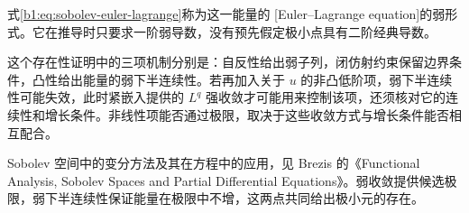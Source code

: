 式\eqref{b1:eq:sobolev-euler-lagrange}称为这一能量的%
[Euler–Lagrange equation]的弱形式。它在推导时只要求一阶弱导数，没有预先假定极小点具有二阶经典导数。

\ProseParagraphBreak

这个存在性证明中的三项机制分别是：自反性给出弱子列，闭仿射约束保留边界条件，凸性给出能量的弱下半连续性。若再加入关于 \(u\) 的非凸低阶项，弱下半连续性可能失效，此时紧嵌入提供的 \(L^q\) 强收敛才可能用来控制该项，还须核对它的连续性和增长条件。非线性项能否通过极限，取决于这些收敛方式与增长条件能否相互配合。

\ProseParagraphBreak

Sobolev 空间中的变分方法及其在方程中的应用，见 Brezis 的《Functional Analysis, Sobolev Spaces and Partial Differential Equations》\cite{Brezis2011Functional}。弱收敛提供候选极限，弱下半连续性保证能量在极限中不增，这两点共同给出极小元的存在。